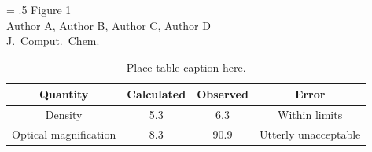 \documentclass[12pt]{article}
\begin{document}
\begin{center}
\end{center}
\vspace{0.25in}
\hspace*{3in}
{\Large
\begin{minipage}[t]{3in}
\baselineskip = .5\baselineskip
Figure 1 \\
Author A, Author B, Author C, Author D \\
J.\ Comput.\ Chem.
\end{minipage}
}

\clearpage

\begin{table}
\begin{tabular}{|c|c|c|c|}\hline
\textbf{Quantity} & \textbf{Calculated} & \textbf{Observed} & \textbf{Error} \\ \hline
  Density & 5.3 & 6.3 & Within limits \\ \hline
  Optical magnification & 8.3 & 90.9 & Utterly unacceptable\! \\ \hline
\end{tabular}
\caption{\label{tbl1} Place table caption here.}
\end{table}
\end{document}
